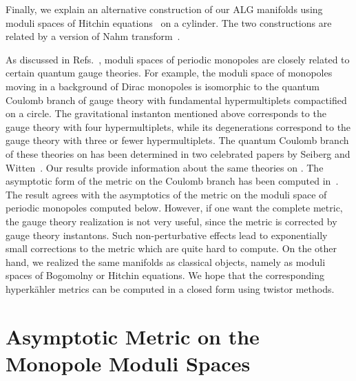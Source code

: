 \documentclass[a4paper,12pt, amsfonts, amssymb]{article}
\providecommand{\RR}{{\mathbb R}}
\renewcommand{\SS}{{\mathbb S}}
\begin{document}
Finally, we explain an alternative construction of our ALG manifolds
using moduli spaces of Hitchin equations~\cite{HitchinSpec} on a cylinder.
The two constructions are related by a version of Nahm transform~\cite{usone,ustwo}.

As discussed in Refs.~\cite{usone,ustwo}, moduli spaces of
periodic monopoles are closely related to certain \coordHE{}  \coordHE{}
quantum gauge theories. For example, the moduli space of \coordHE{}  \coordHE{} monopoles moving in a background of \coordHE{} Dirac monopoles
is isomorphic to the quantum Coulomb branch of \coordHE{} gauge
theory with \coordHE{} fundamental hypermultiplets compactified on a
circle. The \coordHE{} gravitational instanton mentioned above
corresponds to the \coordHE{} gauge theory with four
hypermultiplets, while its degenerations correspond to the
\coordHE{} gauge theory with three or fewer hypermultiplets. The
quantum Coulomb branch of these theories on \myHighlight{$\RR^4$}\coordHE{} has been
determined in two celebrated papers by Seiberg and
Witten~\cite{SW1,SW2}. Our results provide information about the
same theories on \myHighlight{$\RR^3\times\SS^1$}\coordHE{}. The asymptotic form of the
metric on the Coulomb branch has been computed in~\cite{SW3, JWKV, WKV}.
The result agrees with the asymptotics of the metric
on the moduli space of periodic monopoles computed below.
However, if one want the complete metric, the gauge theory realization
is not very useful, since the metric is corrected by gauge theory
instantons. Such non-perturbative effects lead to exponentially small
corrections to the metric which are quite hard to compute.
On the other hand, we realized the same manifolds as classical objects,
namely as moduli spaces  of Bogomolny or Hitchin equations.
We hope that the corresponding hyperk\"ahler metrics can be
computed in a closed form using twistor methods.


\section{Asymptotic Metric on the Monopole Moduli Spaces}
\end{document}
